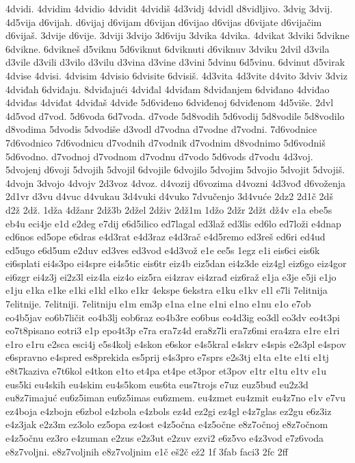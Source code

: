 {4dvidi.
4dvidim
4dvidio
4dvidit
4dvidiš
4d3vidj
4dvidl
d8vidljivo.
3dvig
3dvij.
4d5vija
d6vijah.
d6vijaj
d6vijam
d6vijan
d6vijao
d6vijas
d6vijate
d6vijačim
d6vijaš.
3dvije
d6vije.
3dviji
3dvijo
3d6viju
3dvika
4dvika.
4dvikat
3dviki
5dvikne
6dvikne.
6dvikneš
d5viknu
5d6viknut
6dviknuti
d6viknuv
3dviku
2dvil
d3vila
d3vile
d3vili
d3vilo
d3vilu
d3vina
d3vine
d3vini
5dvinu
6d5vinu.
6dvinut
d5virak
4dvise
4dvisi.
4dvisim
4dvisio
6dvisite
6dvisiš.
4d3vita
4d3vite
d4vito
3dviv
3dviz
4dviđah
6dviđaju.
8dviđajući
4dviđal
4dviđam
8dviđanjem
6dviđano
4dviđao
4dviđas
4dviđat
4dviđaš
4dviđe
5d6viđeno
6dviđenoj
6dviđenom
4d5više.
2dvl
4d5vod
d7vod.
5d6voda
6d7voda.
d7vode
5d8vodih
5d6vodij
5d8vodile
5d8vodilo
d8vodima
5dvodis
5dvodiše
d3vodl
d7vodna
d7vodne
d7vodni.
7d6vodnice
7d6vodnico
7d6vodnicu
d7vodnih
d7vodnik
d7vodnim
d8vodnimo
5d6vodniš
5d6vodno.
d7vodnoj
d7vodnom
d7vodnu
d7vodo
5d6vods
d7vodu
4d3voj.
5dvojenj
d6voji
5dvojih
5dvojil
6dvojile
6dvojilo
5dvojim
5dvojio
5dvojit
5dvojiš.
4dvojn
3dvojo
4dvojv
2d3voz
4dvoz.
d4vozij
d6vozima
d4vozni
4d3vođ
d6voženja
2d1vr
d3vu
d4vuc
d4vukau
3d4vuki
d4vuko
7dvučenjo
3d4vuće
2dz2
2d1č
2dš
d2ž
2dž.
1dža
4džanr
2dž3b
2džel
2dživ
2dž1m
1džo
2džr
2džt
dž4v
e1a
ebe5s
eb4u
eci4je
e1d
e2deg
e7dij
e6d5ilico
ed7lagal
ed3laž
ed3lis
ed6lo
ed7loži
e4dnap
ed6nos
ed5ope
e6dras
e4d3rat
e4d3raz
e4d3rač
e4d5remo
ed3reš
ed6ri
ed4ud
ed5ugo
e6d5um
e2duv
ed3ves
ed3vod
e4d3vož
e1e
ee5s
1egz
e1i
eis6ci
eis6k
ei6splati
ei4s3po
ei4spre
ei4s5tic
eis6tr
eiz4b
eiz5dan
ei4z3de
eiz4gl
eiz6go
eiz4gor
ei6zgr
ei4z3j
ei2z3l
eiz4la
eiz4o
eiz5ra
ei4zrav
ei4zrađ
eiz6raž
e1ja
e3je
e5ji
e1jo
e1ju
e1ka
e1ke
e1ki
e1kl
e1ko
e1kr
4ekspe
6ekstra
e1ku
e1kv
e1l
e7li
7elitnija
7elitnije.
7elitniji.
7elitniju
e1m
em3p
e1na
e1ne
e1ni
e1no
e1nu
e1o
e7ob
eo4b5jav
eo6b7ličit
eo4b3lj
eob6raz
eo4b3re
eo6bus
eo4d3ig
eo3dl
eo3dv
eo4t3pi
eo7t8pisano
eotri3
e1p
epo4t3p
e7ra
era7z4d
era8z7li
era7z6mi
era4zra
e1re
e1ri
e1ro
e1ru
e2sca
esci4j
e5s4kolj
e4skon
e6skor
e4s5kral
e4skrv
e4spis
e2s3pl
e4spov
e6spravno
e4spred
es8prekida
es5prij
e4s3pro
e7sprs
e2s3tj
e1ta
e1te
e1ti
e1tj
e8t7kaziva
e7t6kol
e4tkon
e1to
et4pa
et4pe
et3por
et3pov
e1tr
e1tu
e1tv
e1u
eus5ki
eu4skih
eu4skim
eu4s5kom
eus6ta
eus7trojs
e7uz
euz5buđ
eu2z3d
eu8z7imajuć
eu6z5iman
eu6z5imas
eu6zmem.
eu4zmet
eu4zmit
eu4z7no
e1v
e7vu
ez4boja
e4zbojn
e6zbol
e4zbola
e4zbols
ez4d
ez2gi
ez4gl
e4z7glas
ez2gu
e6z3iz
e4z3jak
e2z3m
ez3olo
ez5opa
ez4ost
e4z5očna
e4z5očne
e8z7očnoj
e8z7očnom
e4z5očnu
ez3ro
e4zuman
e2zus
e2z3ut
e2zuv
ezvi2
e6z5vo
e4z3vod
e7z6voda
e8z7voljni.
e8z7voljnih
e8z7voljnim
e1č
eš2č
ež2
1f
3fab
faci3
2fc
2ff
}

